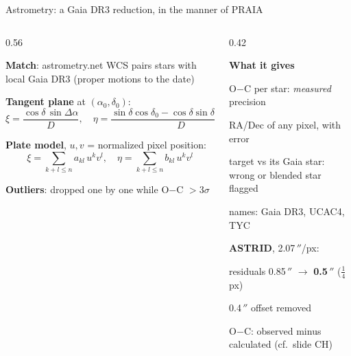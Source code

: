 \begin{frame}{Astrometry: a Gaia DR3 reduction, in the manner of PRAIA}
  \tightdisplays
  \begin{columns}[T]
  \begin{column}{0.56\textwidth}
    \footnotesize
    \begin{tightenum}
      \item \textbf{Match}: astrometry.net WCS pairs stars with local Gaia DR3 (proper motions to the date)
      \item \textbf{Tangent plane} at $(\alpha_0, \delta_0)$:
        \[ \xi = \frac{\cos\delta\,\sin\Delta\alpha}{D},\quad
           \eta = \frac{\sin\delta\cos\delta_0 - \cos\delta\sin\delta_0\cos\Delta\alpha}{D} \]
      \item \textbf{Plate model}, $u, v$ = normalized pixel position:
        \[ \xi = \textstyle\sum_{k+l \le n} a_{kl}\, u^k v^l,\quad \eta = \sum_{k+l \le n} b_{kl}\, u^k v^l \]
      \item \textbf{Outliers}: dropped one by one while O$-$C $> 3\sigma$
    \end{tightenum}
  \end{column}
  \begin{column}{0.42\textwidth}
    \footnotesize
    \begin{tcolorbox}[colback=syzblue!5, colframe=syzblue!40, boxrule=0.4pt, arc=2pt, left=3pt, right=3pt]
      \textbf{What it gives}
      \begin{tightlist}
        \item O$-$C per star: \emph{measured} precision
        \item RA/Dec of any pixel, with error
        \item target vs its Gaia star: wrong or blended star flagged
        \item names: Gaia DR3, UCAC4, TYC
      \end{tightlist}
    \end{tcolorbox}
    \vspace{0.4ex}
    \scriptsize\textbf{ASTRID}, 2.07\,$''$/px:
    \begin{tightlist}
      \item residuals 0.85\,$''$ $\to$ \textbf{0.5\,$''$} ($\frac14$ px)
      \item 0.4\,$''$ offset removed
    \end{tightlist}
    {\tiny O$-$C: observed minus calculated (cf.\ slide CH)\par}
  \end{column}
  \end{columns}
\end{frame}

